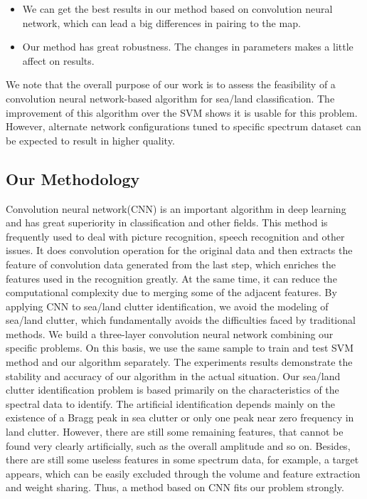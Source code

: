 \begin{itemize}
	\item We can get the best results in our method based on convolution neural network, which can lead a big differences in pairing to the map.
	\item Our method has great robustness. The changes in parameters makes a little affect on results.
\end{itemize}
We note that the overall purpose of our work is to assess the feasibility of a convolution neural network-based algorithm for sea/land classification. The improvement of this algorithm over the SVM shows it is usable for this problem. However, alternate network configurations tuned to specific spectrum dataset can be expected to result in higher quality.



\subsection{Our Methodology}
Convolution neural network(CNN) is an important algorithm in deep learning and has great superiority in classification and other fields. This method is frequently used to deal with picture recognition, speech recognition and other issues. It does convolution operation for the original data and then extracts the feature of convolution data generated from the last step, which enriches the features used in the recognition greatly. At the same time, it can reduce the computational complexity due to merging some of the adjacent features. By applying CNN to sea/land clutter identification, we avoid the modeling of sea/land clutter, which fundamentally avoids the difficulties faced by traditional methods. We build a three-layer convolution neural network combining our specific problems. On this basis, we use the same sample to train and test SVM method and our algorithm separately. The experiments results demonstrate the stability and accuracy of our algorithm in the actual situation. Our sea/land clutter identification problem is based primarily on the characteristics of the spectral data to identify. The artificial identification depends mainly on the existence of a Bragg peak in sea clutter or only one peak near zero frequency in land clutter. However, there are still some remaining features, that cannot be found very clearly artificially, such as the overall amplitude and so on. Besides, there are still some useless features in some spectrum data, for example, a target appears, which can be easily excluded through the volume and feature extraction and weight sharing. Thus, a method based on CNN fits our problem strongly.

